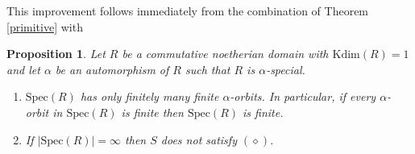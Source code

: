 \documentclass[a4paper, 11pt]{article}
\newtheorem{proposition}[theorem]{Proposition}
\theoremstyle{definition}
\begin{document}
\medskip

\noindent This improvement follows immediately from the combination of Theorem \ref{primitive} with 


\begin{proposition}\label{Jelisi}
Let $R$ be a commutative noetherian domain with $\mathrm{Kdim}(R) = 1$ and let $\alpha$ be an automorphism of $R$ such that $R$ is $\alpha$-special.  
\begin{enumerate}
 \item[(i)]  $\mathrm{Spec}(R)$ has only finitely many finite $\alpha$-orbits. In particular, if every $\alpha$-orbit in $\mathrm{Spec}(R)$ is finite then $\mathrm{Spec}(R)$ is finite.
 \item[(ii)]  If $|\mathrm{Spec}(R)| = \infty$ then $S$ does not satisfy $(\diamond)$.
  
\end{enumerate}

\end{proposition}
\end{document}
